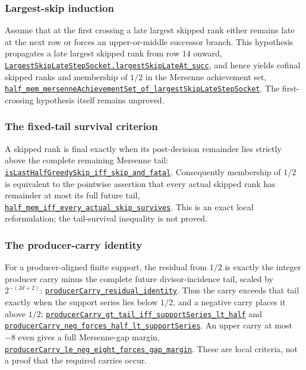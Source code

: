 \documentclass[11pt]{article}
\newcommand{\commit}{81150c1c6fdd4cd51e76d3aa0de344341e0e9e7c}
\newcommand{\repobase}{https://github.com/wcook04/plectis-lean-erdos249-257/blob/\commit}
\newcommand{\PK}{Erdos249257}
\newcommand{\lref}[3]{\href{\repobase/\PK/#1\#L#2}{\nolinkurl{#3}}}
\newcommand{\lrefx}[3]{\href{\repobase/\PK/#1\#L#2}{\nolinkurl{#3}}}
\theoremstyle{definition}
\theoremstyle{remark}
\begin{document}
\subsubsection{Largest-skip induction}\label{res:largestskipinduction}

Assume that at the first crossing a late largest skipped rank either
remains late at the next row or forces an upper-or-middle successor branch.
This hypothesis propagates a late largest skipped rank from row
$14$ onward,
\lref{HalfCylinderLargestSkipInduction.lean}{90}{LargestSkipLateStepSocket.largestSkipLateAt_succ},
and hence yields cofinal skipped ranks and membership of $1/2$ in the Mersenne
achievement set,
\lrefx{HalfCylinderLargestSkipInduction.lean}{167}{half_mem_mersenneAchievementSet_of_largestSkipLateStepSocket}.
The first-crossing hypothesis itself remains unproved.

\subsubsection{The fixed-tail survival criterion}\label{res:fixedtailsocket}

A skipped rank is final exactly when its post-decision remainder lies strictly
above the complete remaining Mersenne tail:
\lref{HalfCylinderFixedTailSocket.lean}{22}{isLastHalfGreedySkip_iff_skip_and_fatal}.
Consequently membership of $1/2$ is equivalent to the pointwise assertion that
every actual skipped rank has remainder at most its full future tail,
\lrefx{HalfCylinderFixedTailSocket.lean}{73}{half_mem_iff_every_actual_skip_survives}.
This is an exact local reformulation; the tail-survival inequality is not
proved.

\subsubsection{The producer-carry identity}\label{res:producercarry}

For a producer-aligned finite support, the residual from $1/2$ is exactly the
integer producer carry minus the complete future divisor-incidence tail,
scaled by $2^{-(2d+2)}$:
\lref{HalfCylinderProducerCarrySocket.lean}{27}{producerCarry_residual_identity}.
Thus the carry exceeds that tail exactly when the support series lies below
$1/2$, and a negative carry places it above $1/2$;
\lrefx{HalfCylinderProducerCarrySocket.lean}{48}{producerCarry_gt_tail_iff_supportSeries_lt_half}
and
\lrefx{HalfCylinderProducerCarrySocket.lean}{145}{producerCarry_neg_forces_half_lt_supportSeries}.
An upper carry at most $-8$ even gives a full Mersenne-gap margin,
\lrefx{HalfCylinderProducerCarrySocket.lean}{190}{producerCarry_le_neg_eight_forces_gap_margin}.
These are local criteria, not a proof that the required carries occur.
\end{document}
